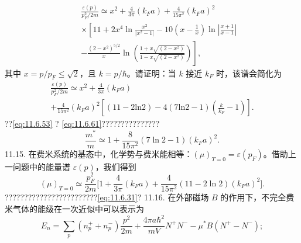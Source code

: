 \begin{equation}\tag{11.6.108}\label{eq:11.6.108}
\begin{array}{rlr} & { } & { \frac { \varepsilon ( p ) } { p _ { F } ^{2} / 2 m } \simeq x ^{2} + \frac { 4 } { 3 \pi } ( k _ { F } a ) + \frac { 4 } { 15 \pi ^{2} } ( k _ { F } a ) ^{2} } \\& { } & { \times \left[ 11 + 2 x ^{4} \ln \frac { x ^{2} } { | x ^{2} - 1 | } - 10 \left( x - \frac { 1 } { x } \right) \ln \left| \frac { x + 1 } { x - 1 } \right| \right. } \\& { } & { \left. - \frac { ( 2 - x ^{2} ) ^{5 / 2} } { x } \ln \left( \frac { 1 + x \sqrt { ( 2 - x ^{2} ) } } { 1 - x \sqrt { ( 2 - x ^{2} ) } } \right) \right] , } \end{array}
\end{equation}
其中 \(x=p/p_{F}\leq\sqrt{2}\)，且 \(k=p/\hbar\)。请证明：当 \(k\) 接近 \(k_{F}\) 时，该谱会简化为
\begin{equation}\tag{11.6.109}\label{eq:11.6.109}
\begin{array}{r} { \frac { \varepsilon ( p ) } { p _ { F } ^{2} / 2 m } \simeq x ^{2} + \frac { 4 } { 3 \pi } ( k _ { F } a ) } \\{ + \frac { 4 } { 15 \pi ^{2} } ( k _ { F } a ) ^{2} \left[ ( 11 - 2 \mathrm { l n } 2 ) - 4 ( 7 \mathrm { l n } 2 - 1 ) \left( \frac { k } { k _ { F } } - 1 \right) \right] . } \end{array}
\end{equation}
??\autoref{eq:11.6.53} ? \autoref{eq:11.6.61}???????????????
\begin{equation}\tag{11.6.110}\label{eq:11.6.110}
\frac { m ^{*} } { m } \simeq 1 + \frac { 8 } { 15 \pi ^{2} } ( 7 \ln 2 - 1 ) ( k _ { F } a ) ^{2} .
\end{equation}
11.15. 在费米系统的基态中，化学势与费米能相等：\((\mu)_{T=0} = \varepsilon(p_F)\)。借助上一问题中的能量谱 \(\varepsilon(p)\)，我们得到
\begin{equation}\tag{11.6.111}\label{eq:11.6.111}
( \mu ) _ { T = 0 } \simeq \frac { p _ { F } ^{2} } { 2 m } \Bigg [ 1 + \frac { 4 } { 3 \pi } ( k _ { F } a ) + \frac { 4 } { 15 \pi ^{2} } ( 11 - 2 \ln 2 ) ( k _ { F } a ) ^{2} \Bigg ] .
\end{equation}
????????????????????????\autoref{eq:11.6.31}?
11.16. 在外部磁场 \(B\) 的作用下，不完全费米气体的能级在一次近似中可以表示为
\begin{equation}\tag{11.6.112}\label{eq:11.6.112}
E _ { n } = \sum _ { p } ( n _ { p } ^{+} + n _ { p } ^{-} ) \frac { p ^{2} } { 2 m } + \frac { 4 \pi a \hbar ^{2} } { m V } N ^{+} N ^{-} - \mu ^{*} B ( N ^{+} - N ^{-} ) ;
\end{equation}
